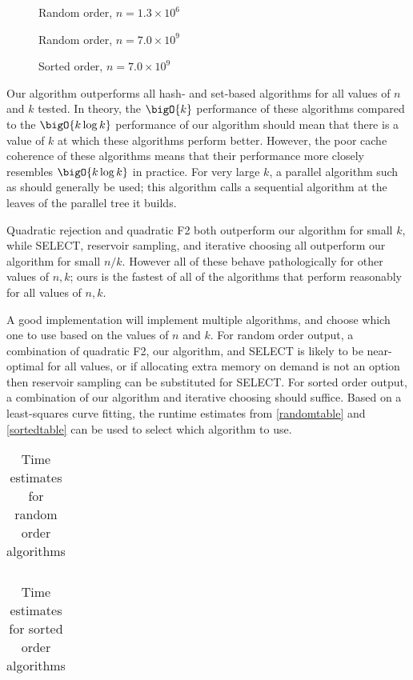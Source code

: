 \documentclass[letterpaper,luatex,11pt]{article}
\begin{document}
\begin{figure}
    
    \caption{Random order, \(n=1.3 \times 10^{6}\)}
    \label{randomsmalln}
\end{figure}

\begin{figure}
    
    \caption{Random order, \(n=7.0 \times 10^{9}\)}
    \label{randomlargen}
\end{figure}

\begin{figure}
    
    \caption{Sorted order, \(n=7.0 \times 10^{9}\)}
    \label{sortedlargen}
\end{figure}

Our algorithm outperforms all hash- and set-based algorithms for all
values of \(n\) and \(k\) tested. In theory, the \(\bigO{k}\)
performance of these algorithms compared to the \(\bigO{k \log k}\)
performance of our algorithm should mean that there is a value of
\(k\) at which these algorithms perform better. However, the poor
cache coherence of these algorithms means that their performance more
closely resembles \(\bigO{k \log k}\) in practice. For very large
\(k\), a parallel algorithm such as \cite{sandersetal} should
generally be used; this algorithm calls a sequential algorithm at the
leaves of the parallel tree it builds.

Quadratic rejection and quadratic F2 both outperform our algorithm for
small \(k\), while SELECT, reservoir sampling, and iterative choosing
all outperform our algorithm for small \(n/k\). However all of these
behave pathologically for other values of \(n, k\); ours is the
fastest of all of the algorithms that perform reasonably for all
values of \(n, k\).

A good implementation will implement multiple algorithms, and choose
which one to use based on the values of \(n\) and \(k\). For random
order output, a combination of quadratic F2, our algorithm, and SELECT
is likely to be near-optimal for all values, or if allocating extra
memory on demand is not an option then reservoir sampling can be
substituted for SELECT. For sorted order output, a combination of our
algorithm and iterative choosing should suffice. Based on a
least-squares curve fitting, the runtime estimates from
\autoref{randomtable} and \autoref{sortedtable} can be used to select
which algorithm to use.

\begin{table}
    \begin{tabular}{ lr }
        
    \end{tabular}
    \caption{Time estimates for random order algorithms}\label{randomtable}
\end{table}

\begin{table}
    \begin{tabular}{ lr } 
        
    \end{tabular}
    \caption{Time estimates for sorted order algorithms}\label{sortedtable}
\end{table}

\printbibliography
\end{document}
